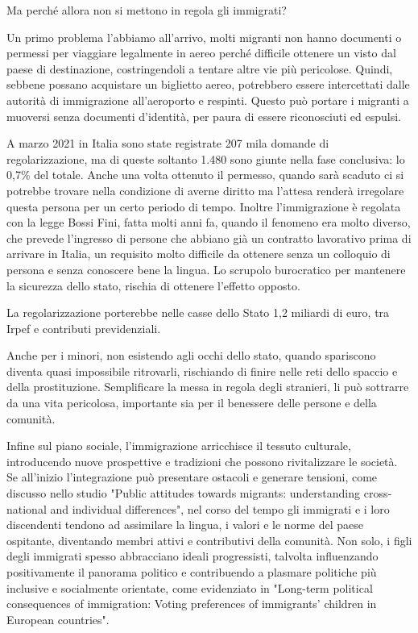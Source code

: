 \documentclass[12pt]{book} %
\begin{document}
Ma perché allora non si mettono in regola gli immigrati? 

Un primo problema l'abbiamo all'arrivo, molti migranti non hanno documenti o permessi per viaggiare legalmente in aereo perché difficile ottenere un visto dal paese di destinazione, costringendoli a tentare altre vie più pericolose. Quindi, sebbene possano acquistare un biglietto aereo, potrebbero essere intercettati dalle autorità di immigrazione all'aeroporto e respinti. Questo può portare i migranti a muoversi senza documenti d'identità, per paura di essere riconosciuti ed espulsi.

A marzo 2021 in Italia sono state registrate 207 mila domande di regolarizzazione, ma di queste soltanto 1.480 sono
giunte nella fase conclusiva: lo 0,7\% del totale. Anche una volta ottenuto il permesso, quando sarà scaduto ci si
potrebbe trovare nella condizione di averne diritto ma l'attesa renderà irregolare questa persona
per un certo periodo di tempo. Inoltre l'immigrazione è regolata con la legge Bossi Fini, fatta molti anni fa, quando il fenomeno era molto diverso,
che prevede l'ingresso di persone che abbiano già un contratto lavorativo prima di arrivare in Italia, un
requisito molto difficile da ottenere senza un colloquio di persona e senza conoscere bene la lingua. 
Lo scrupolo burocratico per mantenere la sicurezza dello stato, rischia di ottenere l'effetto opposto.

La regolarizzazione porterebbe nelle casse dello Stato 1,2 miliardi di euro, tra Irpef e contributi previdenziali. 

Anche per i minori, non esistendo agli occhi dello
stato, quando spariscono diventa quasi impossibile ritrovarli, rischiando di finire nelle reti dello spaccio e della prostituzione.
Semplificare la messa in regola degli stranieri, li può sottrarre da una vita pericolosa, importante sia per il
benessere delle persone e della comunità. 

Infine sul piano sociale, l'immigrazione arricchisce il tessuto culturale, introducendo nuove prospettive e tradizioni che possono rivitalizzare le società. Se all'inizio l'integrazione può presentare ostacoli e generare tensioni, come discusso nello studio "Public attitudes towards migrants: understanding cross‐national and individual differences", nel corso del tempo gli immigrati e i loro discendenti tendono ad assimilare la lingua, i valori e le norme del paese ospitante, diventando membri attivi e contributivi della comunità. Non solo, i figli degli immigrati spesso abbracciano ideali progressisti, talvolta influenzando positivamente il panorama politico e contribuendo a plasmare politiche più inclusive e socialmente orientate, come evidenziato in  "Long-term political consequences of immigration: Voting preferences of immigrants’ children in European countries".
\end{document}
